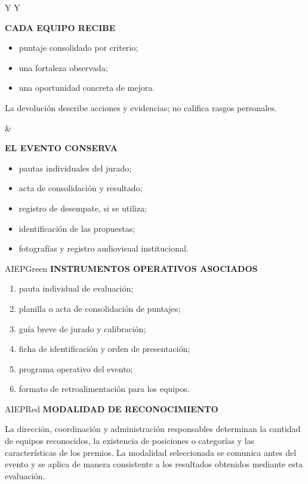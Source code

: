 \documentclass[10pt,a4paper]{article}
\newcommand{\labeltext}[1]{%
  {\scriptsize\bfseries\color{AIEPSlate}\MakeUppercase{#1}}\par\vspace{1.2mm}
}
\begin{document}
\begin{tabularx}{\textwidth}{Y Y}
\begin{card}[height=63mm,valign=top]
\labeltext{Cada equipo recibe}
\begin{itemize}
  \item puntaje consolidado por criterio;
  \item una fortaleza observada;
  \item una oportunidad concreta de mejora.
\end{itemize}
\vspace{3mm}
La devolución describe acciones y evidencias; no califica rasgos personales.
\end{card}
&
\begin{card}[height=63mm,valign=top]
\labeltext{El evento conserva}
\begin{itemize}
  \item pautas individuales del jurado;
  \item acta de consolidación y resultado;
  \item registro de desempate, si se utiliza;
  \item identificación de las propuestas;
  \item fotografías y registro audiovisual institucional.
\end{itemize}
\end{card}
\end{tabularx}

\begin{softcard}{AIEPGreen}
\labeltext{Instrumentos operativos asociados}
\begin{enumerate}
  \item pauta individual de evaluación;
  \item planilla o acta de consolidación de puntajes;
  \item guía breve de jurado y calibración;
  \item ficha de identificación y orden de presentación;
  \item programa operativo del evento;
  \item formato de retroalimentación para los equipos.
\end{enumerate}
\end{softcard}

\begin{softcard}{AIEPRed}
\labeltext{Modalidad de reconocimiento}
La dirección, coordinación y administración responsables determinan la cantidad de equipos
reconocidos, la existencia de posiciones o categorías y las características de los premios. La
modalidad seleccionada se comunica antes del evento y se aplica de manera consistente a los
resultados obtenidos mediante esta evaluación.
\end{softcard}
\end{document}
